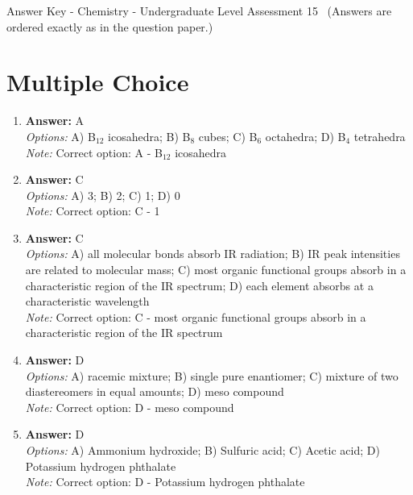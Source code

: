 \documentclass[12pt]{article}
\begin{document}
\begin{center}
Answer Key - Chemistry - Undergraduate Level Assessment 15 \
\small (Answers are ordered exactly as in the question paper.)
\end{center}

\section*{Multiple Choice}
\begin{enumerate}[label=\arabic*.]
\item \textbf{Answer:} A
\\ \textit{Options:} A) B$_{12}$ icosahedra; B) B$_{8}$ cubes; C) B$_{6}$ octahedra; D) B$_{4}$ tetrahedra
\\ \textit{Note:} Correct option: A - B$_{12}$ icosahedra
\item \textbf{Answer:} C
\\ \textit{Options:} A) 3; B) 2; C) 1; D) 0
\\ \textit{Note:} Correct option: C - 1
\item \textbf{Answer:} C
\\ \textit{Options:} A) all molecular bonds absorb IR radiation; B) IR peak intensities are related to molecular mass; C) most organic functional groups absorb in a characteristic region of the IR spectrum; D) each element absorbs at a characteristic wavelength
\\ \textit{Note:} Correct option: C - most organic functional groups absorb in a characteristic region of the IR spectrum
\item \textbf{Answer:} D
\\ \textit{Options:} A) racemic mixture; B) single pure enantiomer; C) mixture of two diastereomers in equal amounts; D) meso compound
\\ \textit{Note:} Correct option: D - meso compound
\item \textbf{Answer:} D
\\ \textit{Options:} A) Ammonium hydroxide; B) Sulfuric acid; C) Acetic acid; D) Potassium hydrogen phthalate
\\ \textit{Note:} Correct option: D - Potassium hydrogen phthalate
\end{enumerate}
\end{document}
